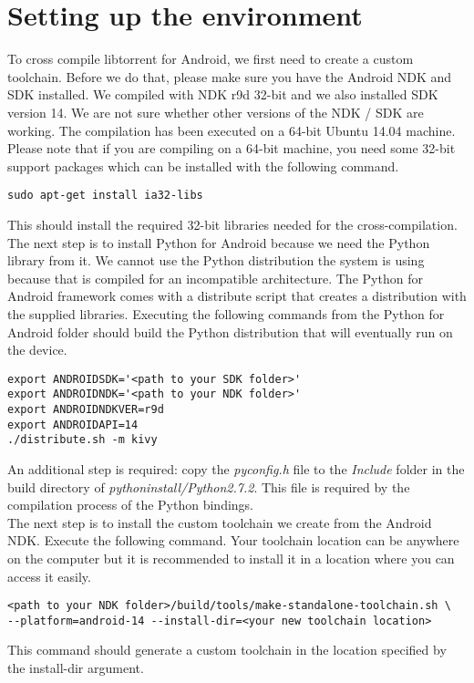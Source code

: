 \section{Setting up the environment}
	To cross compile libtorrent for Android, we first need to create a custom toolchain. Before we do that, please make sure you have the Android NDK and SDK installed. We compiled with NDK r9d 32-bit and we also installed SDK version 14. We are not sure whether other versions of the NDK / SDK are working. The compilation has been executed on a 64-bit Ubuntu 14.04 machine. Please note that if you are compiling on a 64-bit machine, you need some 32-bit support packages which can be installed with the following command.
	\begin{lstlisting}
sudo apt-get install ia32-libs
	\end{lstlisting}
	This should install the required 32-bit libraries needed for the cross-compilation. The next step is to install Python for Android because we need the Python library from it. We cannot use the Python distribution the system is using because that is compiled for an incompatible architecture. The Python for Android framework comes with a distribute script that creates a distribution with the supplied libraries. Executing the following commands from the Python for Android folder should build the Python distribution that will eventually run on the device.
	\begin{lstlisting}
export ANDROIDSDK='<path to your SDK folder>'
export ANDROIDNDK='<path to your NDK folder>'
export ANDROIDNDKVER=r9d
export ANDROIDAPI=14
./distribute.sh -m kivy
	\end{lstlisting}
	An additional step is required: copy the \emph{pyconfig.h} file to the \emph{Include} folder in the build directory of \emph{pythoninstall/Python2.7.2}. This file is required by the compilation process of the Python bindings.\\
	The next step is to install the custom toolchain we create from the Android NDK. Execute the following command. Your toolchain location can be anywhere on the computer but it is recommended to install it in a location where you can access it easily.
	\begin{lstlisting}
<path to your NDK folder>/build/tools/make-standalone-toolchain.sh \
--platform=android-14 --install-dir=<your new toolchain location>
	\end{lstlisting}
	This command should generate a custom toolchain in the location specified by the install-dir argument.\\
